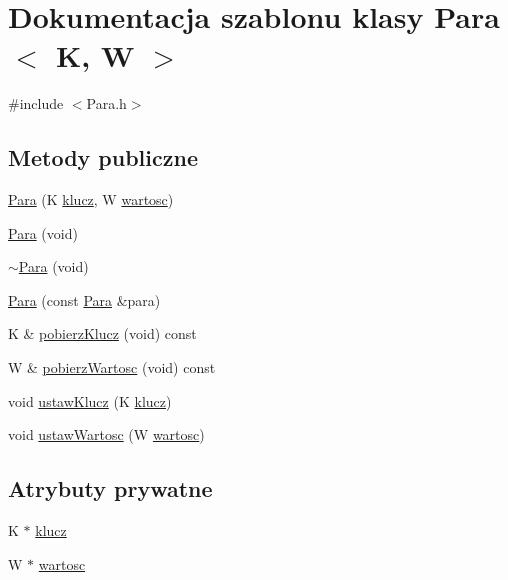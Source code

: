 \hypertarget{class_para}{\section{\-Dokumentacja szablonu klasy \-Para$<$ \-K, \-W $>$}
\label{class_para}
}


{\ttfamily \#include $<$\-Para.\-h$>$}

\subsection*{\-Metody publiczne}
\begin{DoxyCompactItemize}
\item 
\hyperlink{class_para_a8ed1c319f0eaa368ce1c684bff7019ac}{\-Para} (\-K \hyperlink{class_para_a1cf136d1d7c4c7fca4662a04276d744a}{klucz}, \-W \hyperlink{class_para_a942bf7c31ea059ed0cfe1ac41bb21d6b}{wartosc})
\item 
\hyperlink{class_para_a7a6579dbfcb3730202886e82bc9fd345}{\-Para} (void)
\item 
\hyperlink{class_para_a18e9559206df6774b2c0e17ce373f2ac}{$\sim$\-Para} (void)
\item 
\hyperlink{class_para_a0229fba16ccbc9e3019d6db3cf9a6d51}{\-Para} (const \hyperlink{class_para}{\-Para} \&para)
\item 
\-K \& \hyperlink{class_para_a2290aed234696b309e979ae269e142ff}{pobierz\-Klucz} (void) const 
\item 
\-W \& \hyperlink{class_para_a3081579446074d32816e0299743208ca}{pobierz\-Wartosc} (void) const 
\item 
void \hyperlink{class_para_a5582293e44ba99f062dcb9fa8e99beaf}{ustaw\-Klucz} (\-K \hyperlink{class_para_a1cf136d1d7c4c7fca4662a04276d744a}{klucz})
\item 
void \hyperlink{class_para_aee0473cc5204fb4b86b2698c0bd7d150}{ustaw\-Wartosc} (\-W \hyperlink{class_para_a942bf7c31ea059ed0cfe1ac41bb21d6b}{wartosc})
\end{DoxyCompactItemize}
\subsection*{\-Atrybuty prywatne}
\begin{DoxyCompactItemize}
\item 
\-K $\ast$ \hyperlink{class_para_a1cf136d1d7c4c7fca4662a04276d744a}{klucz}
\item 
\-W $\ast$ \hyperlink{class_para_a942bf7c31ea059ed0cfe1ac41bb21d6b}{wartosc}
\end{DoxyCompactItemize}


